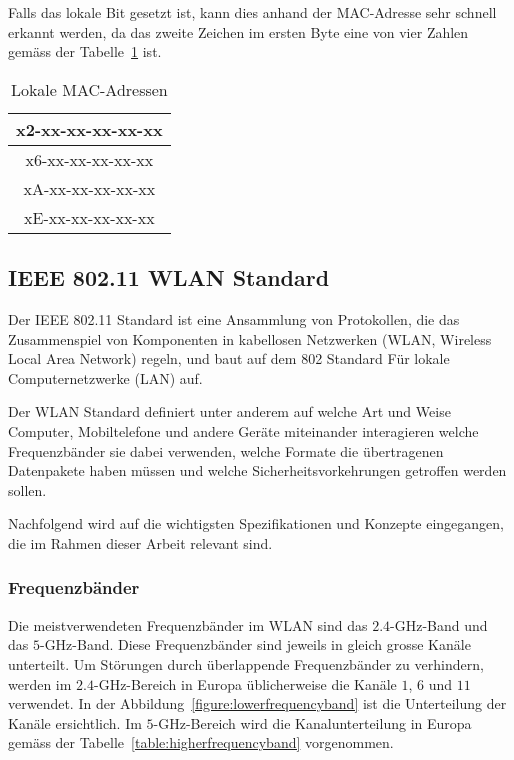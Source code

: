 Falls das lokale Bit gesetzt ist, kann dies anhand der MAC-Adresse sehr schnell
erkannt werden, da das zweite Zeichen im ersten Byte eine von vier Zahlen 
gemäss der Tabelle~\ref{table:localmacrange} ist.

\begin{table}[h!]
	\centering
	\begin{tabular}{|c|}
		\hline
		x2-xx-xx-xx-xx-xx \\
        \hline
        x6-xx-xx-xx-xx-xx \\
        \hline
        xA-xx-xx-xx-xx-xx \\
        \hline
        xE-xx-xx-xx-xx-xx \\
        \hline
    \end{tabular}
    \caption{Lokale MAC-Adressen
    \label{table:localmacrange}}  
\end{table}

\clearpage

\subsection{IEEE 802.11 WLAN Standard}
Der IEEE 802.11 Standard ist eine Ansammlung von Protokollen, 
die das Zusammenspiel von Komponenten in kabellosen Netzwerken 
(WLAN, Wireless Local Area Network) regeln, und baut auf dem 802 Standard
Für lokale Computernetzwerke (LAN) auf.

Der WLAN Standard definiert unter anderem 
auf welche Art und Weise Computer, Mobiltelefone und andere Geräte 
miteinander interagieren welche Frequenzbänder sie dabei verwenden, 
welche Formate die übertragenen Datenpakete haben müssen und welche 
Sicherheitsvorkehrungen getroffen werden sollen.

Nachfolgend wird auf die wichtigsten Spezifikationen und Konzepte eingegangen, 
die im Rahmen dieser Arbeit relevant sind.

\subsubsection*{Frequenzbänder}
Die meistverwendeten Frequenzbänder im WLAN sind das $2.4$-GHz-Band und das 
$5$-GHz-Band. Diese Frequenzbänder sind jeweils in gleich grosse Kanäle 
unterteilt.
Um Störungen durch überlappende Frequenzbänder zu verhindern, werden 
im $2.4$-GHz-Bereich in Europa üblicherweise die Kanäle $1$, $6$ und $11$ 
verwendet.
In der Abbildung~\ref{figure:lowerfrequencyband} ist die Unterteilung der 
Kanäle ersichtlich.
Im $5$-GHz-Bereich wird die Kanalunterteilung in Europa gemäss der 
Tabelle~\ref{table:higherfrequencyband} vorgenommen.

